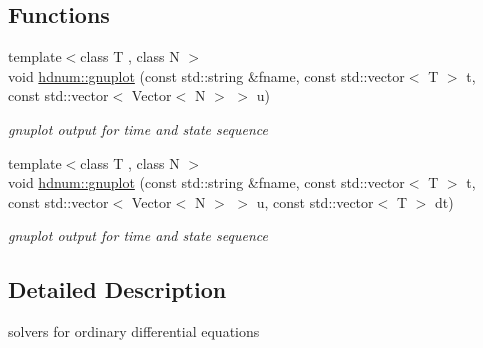 \subsection*{Functions}
\begin{DoxyCompactItemize}
\item 
\hypertarget{namespacehdnum_af626ce0045064b845c0041a9d7327f1b}{
{\footnotesize template$<$class T , class N $>$ }\\void \hyperlink{namespacehdnum_af626ce0045064b845c0041a9d7327f1b}{hdnum::gnuplot} (const std::string \&fname, const std::vector$<$ T $>$ t, const std::vector$<$ Vector$<$ N $>$ $>$ u)}
\label{namespacehdnum_af626ce0045064b845c0041a9d7327f1b}

\begin{DoxyCompactList}\small\item\em gnuplot output for time and state sequence \item\end{DoxyCompactList}\item 
\hypertarget{namespacehdnum_ab0b9aa78d202ad5a652f081d9432dda6}{
{\footnotesize template$<$class T , class N $>$ }\\void \hyperlink{namespacehdnum_ab0b9aa78d202ad5a652f081d9432dda6}{hdnum::gnuplot} (const std::string \&fname, const std::vector$<$ T $>$ t, const std::vector$<$ Vector$<$ N $>$ $>$ u, const std::vector$<$ T $>$ dt)}
\label{namespacehdnum_ab0b9aa78d202ad5a652f081d9432dda6}

\begin{DoxyCompactList}\small\item\em gnuplot output for time and state sequence \item\end{DoxyCompactList}\end{DoxyCompactItemize}


\subsection{Detailed Description}
solvers for ordinary differential equations 